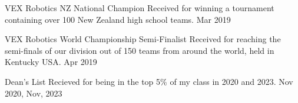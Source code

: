 
\begin{cvhonors}
	\cvhonor
	{VEX Robotics NZ National Champion}
	{Received for winning a tournament containing over 100 New Zealand high school teams.}
	{}
	{Mar 2019}


	\cvhonor
	{VEX Robotics World Championship Semi-Finalist}
	{Received for reaching the semi-finals of our division out of 150 teams from around the world, held in Kentucky USA.}
	{}
	{Apr 2019}

	\cvhonor
	{Dean's List}
	{Recieved for being in the top 5\% of my class in 2020 and 2023.}
	{}
	{Nov 2020, Nov, 2023}
\end{cvhonors}
